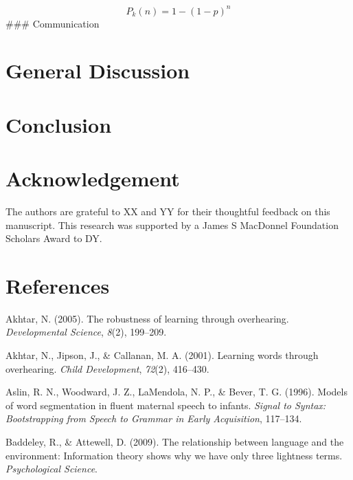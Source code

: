\documentclass[english,,man,floatsintext]{apa6}
\begin{document}
\[ P_k(n) = 1 - \left(1-p\right)^{n}  \]
\#\#\# Communication

\hypertarget{general-discussion}{%
\section{General Discussion}\label{general-discussion}}

\hypertarget{conclusion}{%
\section{Conclusion}\label{conclusion}}

\hypertarget{acknowledgement}{%
\section{Acknowledgement}\label{acknowledgement}}

The authors are grateful to XX and YY for their thoughtful feedback on this manuscript. This research was supported by a James S MacDonnel Foundation Scholars Award to DY.

\newpage

\hypertarget{references}{%
\section{References}\label{references}}

\setlength{\parindent}{-0.5in}
\setlength{\leftskip}{0.5in}

\hypertarget{refs}{}
\leavevmode\hypertarget{ref-akhtar2005}{}%
Akhtar, N. (2005). The robustness of learning through overhearing. \emph{Developmental Science}, \emph{8}(2), 199--209.

\leavevmode\hypertarget{ref-akhtar2001}{}%
Akhtar, N., Jipson, J., \& Callanan, M. A. (2001). Learning words through overhearing. \emph{Child Development}, \emph{72}(2), 416--430.

\leavevmode\hypertarget{ref-aslin1996}{}%
Aslin, R. N., Woodward, J. Z., LaMendola, N. P., \& Bever, T. G. (1996). Models of word segmentation in fluent maternal speech to infants. \emph{Signal to Syntax: Bootstrapping from Speech to Grammar in Early Acquisition}, 117--134.

\leavevmode\hypertarget{ref-baddeley2009}{}%
Baddeley, R., \& Attewell, D. (2009). The relationship between language and the environment: Information theory shows why we have only three lightness terms. \emph{Psychological Science}.
\end{document}
